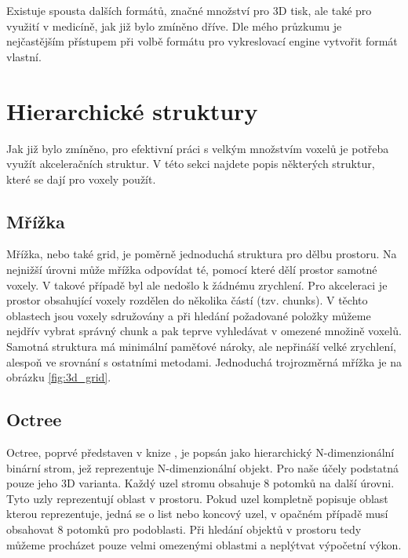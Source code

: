 Existuje spousta dalších formátů, značné množství pro 3D tisk, ale také pro využití v medicíně, jak již bylo zmíněno dříve. Dle mého průzkumu je nejčastějším přístupem při volbě formátu pro vykreslovací engine vytvořit formát vlastní.


\section{Hierarchické struktury}
Jak již bylo zmíněno, pro efektivní práci s velkým množstvím voxelů je potřeba využít akceleračních struktur. V této sekci najdete popis některých struktur, které se dají pro voxely použít.

\subsection{Mřížka}
Mřížka, nebo také grid, je poměrně jednoduchá struktura pro dělbu prostoru. Na nejnižší úrovni může mřížka odpovídat té, pomocí které dělí prostor samotné voxely. V takové případě byl ale nedošlo k žádnému zrychlení. Pro akceleraci je prostor obsahující voxely rozdělen do několika částí (tzv. chunks). V těchto oblastech jsou voxely sdružovány a při hledání požadované položky můžeme nejdřív vybrat správný chunk a pak teprve vyhledávat v omezené množině voxelů. Samotná struktura má minimální paměťové nároky, ale nepřináší velké zrychlení, alespoň ve srovnání s ostatními metodami. Jednoduchá trojrozměrná mřížka je na obrázku \ref{fig:3d_grid}.

\subsection{Octree}
Octree, poprvé představen v knize \cite{rensselaer1980octree}, je popsán jako hierarchický N-dimenzionální binární strom, jež reprezentuje N-dimenzionální objekt. Pro naše účely podstatná pouze jeho 3D varianta. Každý uzel stromu obsahuje 8 potomků na další úrovni. Tyto uzly reprezentují oblast v prostoru. Pokud uzel kompletně popisuje oblast kterou reprezentuje, jedná se o list nebo koncový uzel, v opačném případě musí obsahovat 8 potomků pro podoblasti. Při hledání objektů v prostoru tedy můžeme procházet pouze velmi omezenými oblastmi a neplýtvat výpočetní výkon. 

